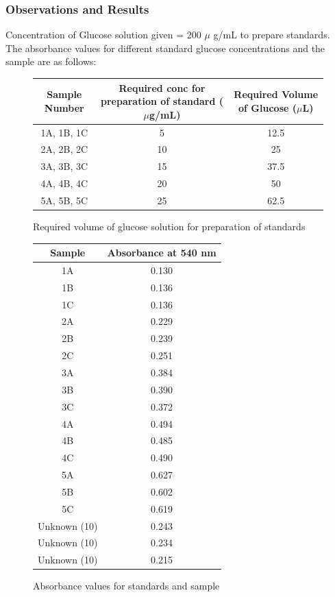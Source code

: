 \documentclass[openany]{book}
\begin{document}
\subsubsection{Observations and Results}
Concentration of Glucose solution given = 200 $\mu$ g/mL to prepare standards. \\
The absorbance values for different standard glucose concentrations and the sample are as follows: \\
\begin{figure}[H]
    \centering
    \begin{tabular}{|c|c|c|}
        \hline
        Sample Number & Required conc for preparation of standard ($\mu$g/mL) & Required Volume of Glucose ($\mu$L) \\
        \hline
        1A, 1B, 1C & 5 & 12.5 \\
        2A, 2B, 2C & 10 & 25 \\
        3A, 3B, 3C & 15 & 37.5 \\
        4A, 4B, 4C & 20 & 50 \\
        5A, 5B, 5C & 25 & 62.5 \\
        \hline
    \end{tabular}
    \caption{Required volume of glucose solution for preparation of standards}
\end{figure}
\begin{figure}[H]
    \centering
    \begin{tabular}{|c|c|}
        \hline
        Sample & Absorbance at 540 nm \\
        \hline
        1A & 0.130 \\
        1B & 0.136 \\
        1C & 0.136 \\
        2A & 0.229 \\
        2B & 0.239 \\
        2C & 0.251 \\
        3A & 0.384 \\
        3B & 0.390 \\
        3C & 0.372 \\
        4A & 0.494 \\
        4B & 0.485 \\
        4C & 0.490 \\
        5A & 0.627 \\
        5B & 0.602 \\
        5C & 0.619 \\
        Unknown (10) & 0.243 \\
        Unknown (10) & 0.234 \\
        Unknown (10) & 0.215 \\
        \hline
    \end{tabular}
    \caption{Absorbance values for standards and sample}
\end{figure}
\end{document}
